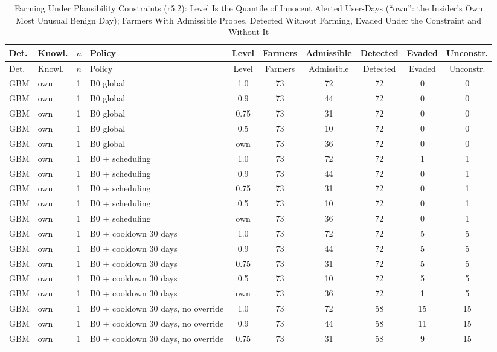 \begin{longtable}{lllp{4.4cm}cccccc}
\caption{Farming Under Plausibility Constraints (r5.2): Level Is the Quantile of Innocent Alerted User-Days (``own'': the Insider's Own Most Unusual Benign Day); Farmers With Admissible Probes, Detected Without Farming, Evaded Under the Constraint and Without It\label{tab:e-m2-r52}}\\
\toprule
Det. & Knowl. & $n$ & Policy & Level & Farmers & Admissible & Detected & Evaded & Unconstr. \\
\midrule
\endfirsthead
\toprule
Det. & Knowl. & $n$ & Policy & Level & Farmers & Admissible & Detected & Evaded & Unconstr. \\
\midrule
\endhead
GBM & own & 1 & B0 global & 1.0 & 73 & 72 & 72 & 0 & 0 \\
GBM & own & 1 & B0 global & 0.9 & 73 & 44 & 72 & 0 & 0 \\
GBM & own & 1 & B0 global & 0.75 & 73 & 31 & 72 & 0 & 0 \\
GBM & own & 1 & B0 global & 0.5 & 73 & 10 & 72 & 0 & 0 \\
GBM & own & 1 & B0 global & own & 73 & 36 & 72 & 0 & 0 \\
GBM & own & 1 & B0 + scheduling & 1.0 & 73 & 72 & 72 & 1 & 1 \\
GBM & own & 1 & B0 + scheduling & 0.9 & 73 & 44 & 72 & 0 & 1 \\
GBM & own & 1 & B0 + scheduling & 0.75 & 73 & 31 & 72 & 0 & 1 \\
GBM & own & 1 & B0 + scheduling & 0.5 & 73 & 10 & 72 & 0 & 1 \\
GBM & own & 1 & B0 + scheduling & own & 73 & 36 & 72 & 0 & 1 \\
GBM & own & 1 & B0 + cooldown 30 days & 1.0 & 73 & 72 & 72 & 5 & 5 \\
GBM & own & 1 & B0 + cooldown 30 days & 0.9 & 73 & 44 & 72 & 5 & 5 \\
GBM & own & 1 & B0 + cooldown 30 days & 0.75 & 73 & 31 & 72 & 5 & 5 \\
GBM & own & 1 & B0 + cooldown 30 days & 0.5 & 73 & 10 & 72 & 5 & 5 \\
GBM & own & 1 & B0 + cooldown 30 days & own & 73 & 36 & 72 & 1 & 5 \\
GBM & own & 1 & B0 + cooldown 30 days, no override & 1.0 & 73 & 72 & 58 & 15 & 15 \\
GBM & own & 1 & B0 + cooldown 30 days, no override & 0.9 & 73 & 44 & 58 & 11 & 15 \\
GBM & own & 1 & B0 + cooldown 30 days, no override & 0.75 & 73 & 31 & 58 & 9 & 15 \\

\end{longtable}
